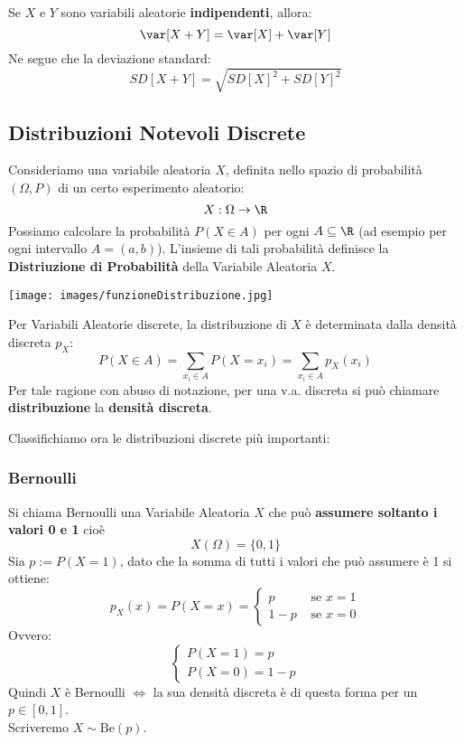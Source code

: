 Se $X$ e $Y$ sono variabili aleatorie \textbf{indipendenti}, allora:
\[
	\var[X+Y] = \var[X] + \var[Y]
\]
Ne segue che la deviazione standard:
\[
	SD[X+Y] = \sqrt{SD[X]^2 + SD[Y]^2}
\]



\subsection{Distribuzioni Notevoli Discrete}
Consideriamo una variabile aleatoria $X$, definita nello spazio di probabilità
$(\Omega, P)$ di un certo esperimento aleatorio:
\[
	X:\Omega \rightarrow \R
\]
Possiamo calcolare la probabilità $P(X \in A)$ per ogni $A \subseteq \R$
(ad esempio per ogni intervallo $A=(a,b)$).
L'insieme di tali probabilità definisce la \textbf{Distriuzione di Probabilità} della Variabile Aleatoria $X$.
\begin{center}
	\texttt{[image: images/funzioneDistribuzione.jpg]}
\end{center}

Per Variabili Aleatorie discrete, la distribuzione di $X$ è determinata dalla densità discreta $p_X$:
\[
	P(X \in A) = \sum_{x_i \in A} P(X=x_i) = \sum_{x_i \in A} p_X(x_i)
\]
Per tale ragione con abuso di notazione, per una v.a. discreta si può chiamare
\textbf{distribuzione} la \textbf{densità discreta}.

Classifichiamo ora le distribuzioni discrete più importanti:

\subsubsection{Bernoulli}
Si chiama Bernoulli una Variabile Aleatoria $X$ che può \textbf{assumere soltanto i valori 0 e 1} cioè
\[
	X(\Omega) = \{0,1\}
\]
Sia $p:=P(X=1)$, dato che la somma di tutti i valori che può assumere è 1 si ottiene:
\[
	p_X (x) = P(X=x) =
	\begin{cases}
		p   & \text{ se } x=1 \\
		1-p & \text{ se } x=0
	\end{cases}
\]
Ovvero:
\[
	\begin{cases}
		P(X=1) = p \\
		P(X=0)= 1-p
	\end{cases}
\]
Quindi $X$ è Bernoulli $\Leftrightarrow$ la sua densità discreta è di questa
forma per un $p \in [0,1]$.
\\ Scriveremo $X \sim \text{Be}(p)$.

